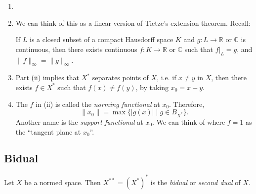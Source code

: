 \documentclass[12pt]{article}
\begin{document}
\begin{remark}
	\begin{enumerate}
		\item[]
		\item We can think of this as a linear version of Tietze's extension theorem. Recall:

			If $L$ is a closed subset of a compact Hausdorff space $K$ and $g : L \to \mathbb{R}$ or $\mathbb{C}$ is continuous, then there exists continuous $f : K \to \mathbb{R}$ or $\mathbb{C}$ such that $f|_L = g$, and $\|f\|_\infty = \|g\|_\infty$.
		\item Part (ii) implies that $X^\ast$ separates points of $X$, i.e. if $x \neq y$ in $X$, then there exists $f \in X^\ast$ such that $f(x) \neq f(y)$, by taking $x_0 = x - y$.
		\item The $f$ in (ii) is called the \emph{norming functional} at $x_0$. Therefore,
			\[
				\|x_0\| = \max \{|g(x)| \mid g \in B_{X^\ast}\}.
			\]
			Another name is the \emph{support functional} at $x_0$. We can think of where $f = 1$ as the ``tangent plane at $x_0$''.
	\end{enumerate}
\end{remark}

\begin{center}
\end{center}

\subsection{Bidual}%
\label{sub:bidual}

Let $X$ be a normed space. Then $X^{\ast\ast} = (X^\ast)^\ast$ is the \emph{bidual} or \emph{second dual} of $X$.
\end{document}
